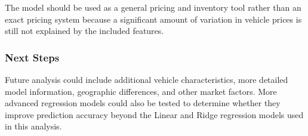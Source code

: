 \documentclass[11pt]{article}
\makeatletter
\newcommand{\boxspacing}{\kern\kvtcb@left@rule\kern\kvtcb@boxsep}
\newcommand{\prompt}[4]{
        {\ttfamily\llap{{\color{#2}[#3]:\hspace{3pt}#4}}\vspace{-\baselineskip}}
    }
\makeatother
\begin{document}
The model should be used as a general pricing and inventory tool rather
than an exact pricing system because a significant amount of variation
in vehicle prices is still not explained by the included features.

\hypertarget{next-steps}{%
\subsubsection{Next Steps}\label{next-steps}}

Future analysis could include additional vehicle characteristics, more
detailed model information, geographic differences, and other market
factors. More advanced regression models could also be tested to
determine whether they improve prediction accuracy beyond the Linear and
Ridge regression models used in this analysis.

    \begin{tcolorbox}[breakable, size=fbox, boxrule=1pt, pad at break*=1mm,colback=cellbackground, colframe=cellborder]
\prompt{In}{incolor}{ }{\boxspacing}
\begin{Verbatim}[commandchars=\\\{\}]

\end{Verbatim}
\end{tcolorbox}

    \begin{tcolorbox}[breakable, size=fbox, boxrule=1pt, pad at break*=1mm,colback=cellbackground, colframe=cellborder]
\prompt{In}{incolor}{ }{\boxspacing}
\begin{Verbatim}[commandchars=\\\{\}]

\end{Verbatim}
\end{tcolorbox}

    \begin{tcolorbox}[breakable, size=fbox, boxrule=1pt, pad at break*=1mm,colback=cellbackground, colframe=cellborder]
\prompt{In}{incolor}{ }{\boxspacing}
\begin{Verbatim}[commandchars=\\\{\}]

\end{Verbatim}
\end{tcolorbox}

    \begin{tcolorbox}[breakable, size=fbox, boxrule=1pt, pad at break*=1mm,colback=cellbackground, colframe=cellborder]
\prompt{In}{incolor}{ }{\boxspacing}
\begin{Verbatim}[commandchars=\\\{\}]

\end{Verbatim}
\end{tcolorbox}
\end{document}
